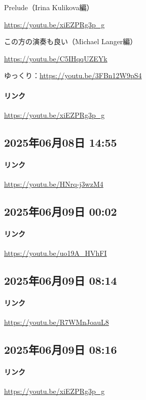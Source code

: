 Prelude（Irina Kulikova編）

\url{https://youtu.be/xiEZPRg3p_g}

この方の演奏も良い（Michael Langer編）

\url{https://youtu.be/C5IHqqUZEYk}

ゆっくり：\url{https://youtu.be/3FBn12W9pS4}

\paragraph{リンク}
\url{https://youtu.be/xiEZPRg3p_g}

\subsection*{2025年06月08日 14:55}

\paragraph{リンク}
\url{https://youtu.be/HNrq-j3wzM4}

\subsection*{2025年06月09日 00:02}

\paragraph{リンク}
\url{https://youtu.be/uo19A_HVhFI}

\subsection*{2025年06月09日 08:14}

\paragraph{リンク}
\url{https://youtu.be/R7WMnJoauL8}

\subsection*{2025年06月09日 08:16}

\paragraph{リンク}
\url{https://youtu.be/xiEZPRg3p_g}

